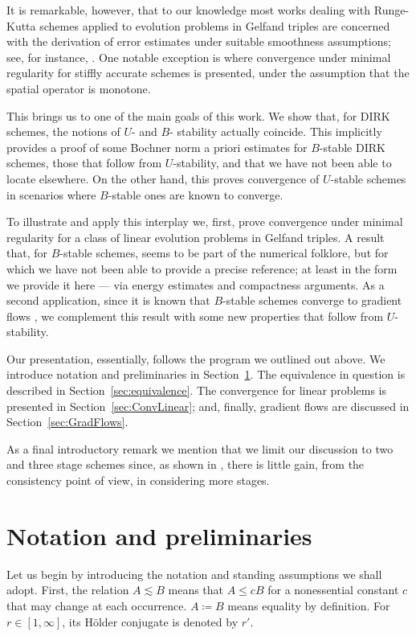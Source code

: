 \documentclass{amsart}
\theoremstyle{definition}
\begin{document}
It is remarkable, however, that to our knowledge most works dealing with Runge-Kutta schemes applied to evolution problems in Gelfand triples are concerned with the derivation of error estimates under suitable smoothness assumptions; see, for instance, \cite{MR1284670,MR2329662}. One notable exception is \cite{MR2600543} where convergence under minimal regularity for stiffly accurate schemes is presented, under the assumption that the spatial operator is monotone.

This brings us to one of the main goals of this work. We show that, for DIRK schemes, the notions of $U$- and $B$- stability actually coincide. This implicitly provides a proof of some Bochner norm a priori estimates for $B$-stable DIRK schemes, those that follow from $U$-stability, and that we have not been able to locate elsewhere. On the other hand, this proves convergence of $U$-stable schemes in scenarios where $B$-stable ones are known to converge.

To illustrate and apply this interplay we, first, prove convergence under minimal regularity for a class of linear evolution problems in Gelfand triples. A result that, for $B$-stable schemes, seems to be part of the numerical folklore, but for which we have not been able to provide a precise reference; at least in the form we provide it here --- via energy estimates and compactness arguments. As a second application, since it is known that $B$-stable schemes converge to gradient flows \cite{MR2566077}, we complement this result with some new properties that follow from $U$-stability.

Our presentation, essentially, follows the program we outlined out above. We introduce notation and preliminaries in Section~\ref{sec:Notation}. The equivalence in question is described in Section~\ref{sec:equivalence}. The convergence for linear problems is presented in Section~\ref{sec:ConvLinear}; and, finally, gradient flows are discussed in Section~\ref{sec:GradFlows}.

As a final introductory remark we mention that we limit our discussion to two and three stage schemes since, as shown in \cite{MR458890}, there is little gain, from the consistency point of view, in considering more stages.

\section{Notation and preliminaries}
\label{sec:Notation}

Let us begin by introducing the notation and standing assumptions we shall adopt. First, the relation $A \lesssim B$ means that $A \leq c B$ for a nonessential constant $c$ that may change at each occurrence. $A \coloneqq B$ means equality by definition. For $r \in [1,\infty]$, its H\"older conjugate is denoted by $r'$.
\end{document}
